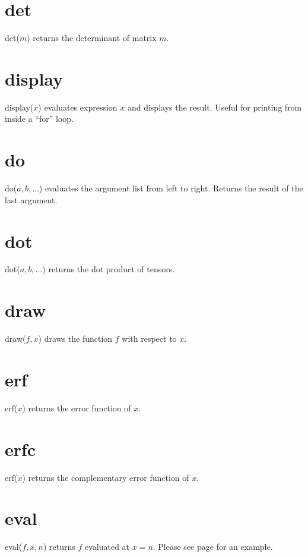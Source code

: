 \documentclass[12pt,openany]{report}
\begin{document}
\section*{det}
det($m$) returns the determinant of matrix $m$.

\section*{display}
display($x$) evaluates expression $x$ and displays the result.
Useful for printing from inside a ``for'' loop.

\section*{do}
do($a,b,\ldots$) evaluates the argument list from left to right.
Returns the result of the last argument.

\section*{dot}
dot($a,b,\ldots$) returns the dot product of tensors.

\section*{draw}
draw($f,x$) draws the function $f$ with respect to $x$.

\section*{erf}
erf($x$) returns the error function of $x$.

\section*{erfc}
erf($x$) returns the complementary error function of $x$.

\section*{eval}
eval($f,x,n$) returns $f$ evaluated at $x=n$.
Please see page \pageref{integral} for an example.
\end{document}
